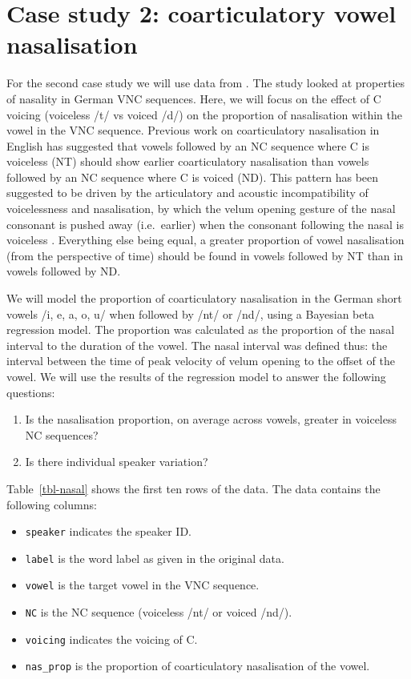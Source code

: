 \documentclass[
  authoryear,
  preprint,
  3p]{elsarticle}
\providecommand{\tightlist}{%
  \setlength{\itemsep}{0pt}\setlength{\parskip}{0pt}} %
\begin{document}
\section{Case study 2: coarticulatory vowel
nasalisation}\label{sec-case-2}

For the second case study we will use data from \citet{carignan2021}.
The study looked at properties of nasality in German VNC sequences.
Here, we will focus on the effect of C voicing (voiceless /t/ vs voiced
/d/) on the proportion of nasalisation within the vowel in the VNC
sequence. Previous work on coarticulatory nasalisation in English has
suggested that vowels followed by an NC sequence where C is voiceless
(NT) should show earlier coarticulatory nasalisation than vowels
followed by an NC sequence where C is voiced (ND). This pattern has been
suggested to be driven by the articulatory and acoustic incompatibility
of voicelessness and nasalisation, by which the velum opening gesture of
the nasal consonant is pushed away (i.e.~earlier) when the consonant
following the nasal is voiceless
\citep{fowler2005, beddor2009, cho2017, carignan2015}. Everything else
being equal, a greater proportion of vowel nasalisation (from the
perspective of time) should be found in vowels followed by NT than in
vowels followed by ND.

We will model the proportion of coarticulatory nasalisation in the
German short vowels /i, e, a, o, u/ when followed by /nt/ or /nd/, using
a Bayesian beta regression model. The proportion was calculated as the
proportion of the nasal interval to the duration of the vowel. The nasal
interval was defined thus: the interval between the time of peak
velocity of velum opening to the offset of the vowel. We will use the
results of the regression model to answer the following questions:

\begin{enumerate}
\def\labelenumi{\arabic{enumi}.}
\tightlist
\item
  Is the nasalisation proportion, on average across vowels, greater in
  voiceless NC sequences?
\item
  Is there individual speaker variation?
\end{enumerate}

Table~\ref{tbl-nasal} shows the first ten rows of the data. The data
contains the following columns:

\begin{itemize}
\item
  \texttt{speaker} indicates the speaker ID.
\item
  \texttt{label} is the word label as given in the original data.
\item
  \texttt{vowel} is the target vowel in the VNC sequence.
\item
  \texttt{NC} is the NC sequence (voiceless /nt/ or voiced /nd/).
\item
  \texttt{voicing} indicates the voicing of C.
\item
  \texttt{nas\_prop} is the proportion of coarticulatory nasalisation of
  the vowel.
\end{itemize}
\end{document}
